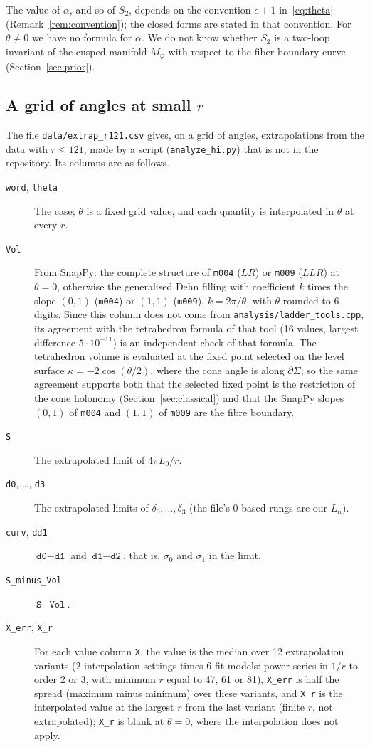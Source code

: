 \documentclass[11pt]{amsart}
\theoremstyle{definition}
\theoremstyle{remark}
\begin{document}
The value of $\alpha$, and so of $S_2$, depends on the convention $c+1$
in~\eqref{eq:theta} (Remark~\ref{rem:convention}); the closed forms are stated in that
convention. For $\theta \ne 0$ we have no formula for $\alpha$. We do not know whether $S_2$ is a
two-loop invariant of the cusped manifold $M_\varphi$ with respect to the fiber
boundary curve (Section~\ref{sec:prior}).

\subsection{A grid of angles at small $r$}\label{sec:grid}
The file \texttt{data/extrap\_r121.csv} gives, on a grid of angles, extrapolations
from the data with $r \le 121$, made by a script (\texttt{analyze\_hi.py}) that is not
in the repository. Its columns are as follows.
\begin{description}
\item[\texttt{word}, \texttt{theta}] The case; $\theta$ is a fixed grid value, and
each quantity is interpolated in $\theta$ at every $r$.
\item[\texttt{Vol}] From SnapPy: the complete structure of \texttt{m004} ($LR$) or
\texttt{m009} ($LLR$) at $\theta = 0$, otherwise the generalised Dehn filling with
coefficient $k$ times the slope $(0,1)$ (\texttt{m004}) or $(1,1)$ (\texttt{m009}),
$k = 2\pi/\theta$, with $\theta$ rounded to 6 digits. Since this column does not come
from \texttt{analysis/ladder\_tools.cpp}, its agreement with the tetrahedron formula
of that tool (16 values, largest difference $5\cdot10^{-11}$) is an independent check
of that formula. The tetrahedron volume is evaluated at the fixed point selected on
the level surface $\kappa = -2\cos(\theta/2)$, where the cone angle is along
$\partial\Sigma$; so the same agreement supports both that the selected fixed point
is the restriction of the cone holonomy (Section~\ref{sec:classical}) and that the
SnapPy slopes $(0,1)$ of \texttt{m004} and $(1,1)$ of \texttt{m009} are the fibre
boundary.
\item[\texttt{S}] The extrapolated limit of $4\pi L_0/r$.
\item[\texttt{d0}, \dots, \texttt{d3}] The extrapolated limits of
$\delta_0, \dots, \delta_3$ (the file's 0-based rungs are our $L_n$).
\item[\texttt{curv}, \texttt{dd1}] $\texttt{d0} - \texttt{d1}$ and
$\texttt{d1} - \texttt{d2}$, that is, $\sigma_0$ and $\sigma_1$ in the limit.
\item[\texttt{S\_minus\_Vol}] $\texttt{S} - \texttt{Vol}$.
\item[\texttt{X\_err}, \texttt{X\_r}] For each value column \texttt{X}, the value is
the median over 12 extrapolation variants (2 interpolation settings times 6 fit
models: power series in $1/r$ to order 2 or 3, with minimum $r$ equal to 47, 61 or
81), \texttt{X\_err} is half the spread (maximum minus minimum) over these variants,
and \texttt{X\_r} is the interpolated value at the largest $r$ from the last variant
(finite $r$, not extrapolated); \texttt{X\_r} is blank at $\theta = 0$, where the
interpolation does not apply.
\end{description}
\end{document}
